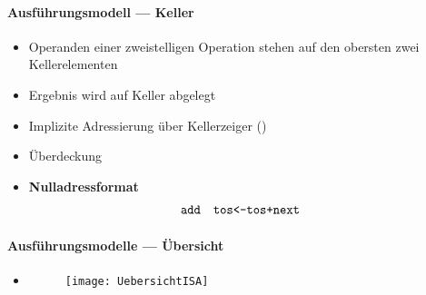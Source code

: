\paragraph{Ausführungsmodell --- Keller}
\begin{itemize}
	\item Operanden einer zweistelligen Operation stehen auf den obersten zwei Kellerelementen
	\item Ergebnis wird auf Keller abgelegt
	\item Implizite Adressierung über Kellerzeiger ()
	\item Überdeckung
	\item \textbf{Nulladressformat}
	\begin{align*}
		\text{\code{add}} &\quad \text{\code{tos<-tos+next}}
	\end{align*}
\end{itemize}

\paragraph{Ausführungsmodelle --- Übersicht}
\begin{itemize}
	\item 
	\begin{center}
	\end{center}
	\begin{figure}[ht]
	  \centering
	  \texttt{[image: UebersichtISA]}
	  \label{UebersichtISA}
	\end{figure}
\end{itemize}

